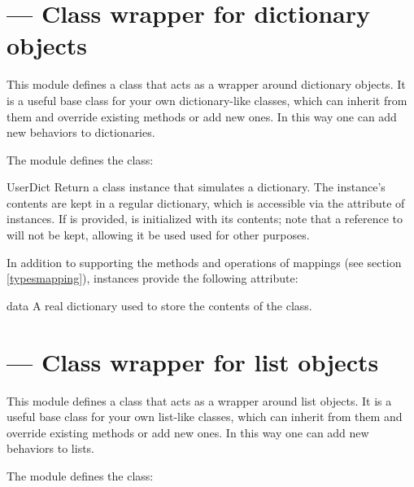 \section{ ---
         Class wrapper for dictionary objects}


This module defines a class that acts as a wrapper around
dictionary objects.  It is a useful base class for
your own dictionary-like classes, which can inherit from
them and override existing methods or add new ones.  In this way one
can add new behaviors to dictionaries.

The  module defines the  class:

\begin{classdesc}{UserDict}{}
Return a class instance that simulates a dictionary.  The instance's
contents are kept in a regular dictionary, which is accessible via the
 attribute of  instances.  If
 is provided,  is initialized with its
contents; note that a reference to  will not be kept, 
allowing it be used used for other purposes.
\end{classdesc}

In addition to supporting the methods and operations of mappings (see
section \ref{typesmapping}),  instances provide the
following attribute:

\begin{memberdesc}{data}
A real dictionary used to store the contents of the 
class.
\end{memberdesc}


\section{ ---
         Class wrapper for list objects}



This module defines a class that acts as a wrapper around
list objects.  It is a useful base class for
your own list-like classes, which can inherit from
them and override existing methods or add new ones.  In this way one
can add new behaviors to lists.

The  module defines the  class:


